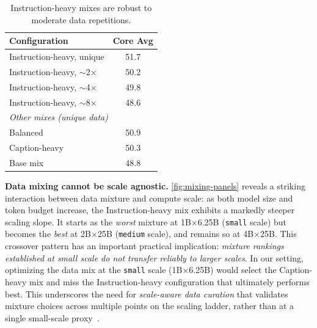 \begin{table}
    \centering
    \caption{Instruction-heavy mixes are robust to moderate data repetitions.}
    \label{tab:it-repeats}
    \small
    \begin{tabular}{lc}
        \toprule
        \textbf{Configuration} & \textbf{Core Avg} \\
        \midrule
        Instruction-heavy, unique    & 51.7 \\
        Instruction-heavy, $\sim$2$\times$  & 50.2 \\
        Instruction-heavy, $\sim$4$\times$  & 49.8 \\
        Instruction-heavy, $\sim$8$\times$  & 48.6 \\
        \midrule
        \multicolumn{2}{l}{\textit{Other mixes (unique data)}} \\
        \quad Balanced & 50.9 \\
        \quad Caption-heavy & 50.3 \\
        \quad Base mix           & 48.8 \\
        \bottomrule
    \end{tabular}
\end{table}

\textbf{Data mixing cannot be scale agnostic.}\label{sec:scale-mixing} \cref{fig:mixing-panels} reveals a striking interaction between data mixture and compute scale:
as both model size and token budget increase, the Instruction-heavy mix exhibits a markedly steeper scaling slope.
It starts as the \emph{worst} mixture at 1B$\times$6.25B (\texttt{small} scale) but becomes the \emph{best} at 2B$\times$25B (\texttt{medium} scale), and remains so at 4B$\times$25B. 
This crossover pattern has an important practical implication: \emph{mixture rankings established at small scale do not transfer reliably to larger scales}.
In our setting, optimizing the data mix at the \texttt{small} scale (1B$\times$6.25B) would select the Caption-heavy mix and miss the Instruction-heavy configuration that ultimately performs best.
This underscores the need for \textit{scale-aware data curation} that validates mixture choices across multiple points on the scaling ladder, rather than at a single small-scale proxy~\citep{nezhurina2025scaling,nguyen2025mixturevitae,mizrahi2025language,goyal2024scaling,shukor2025scaling,mohri2026bitter,gao2021empirical}.


